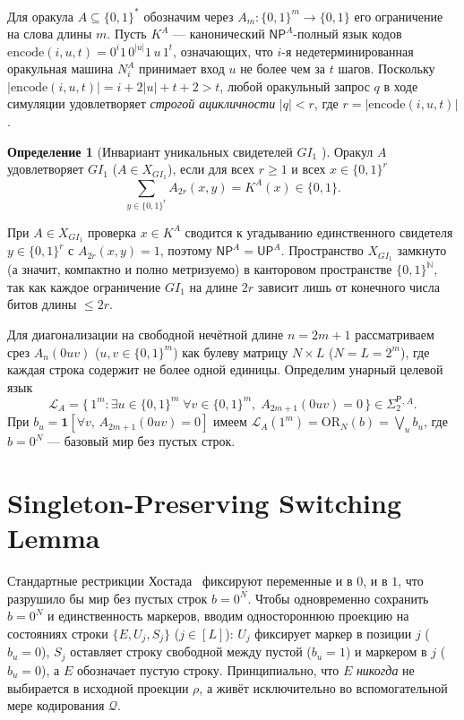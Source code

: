 \documentclass[11pt,a4paper]{article}
\theoremstyle{definition}
\newtheorem{definition}[theorem]{Определение}
\theoremstyle{remark}
\newcommand{\NP}{\mathsf{NP}}
\newcommand{\UP}{\mathsf{UP}}
\newcommand{\SigTwo}{\Sigma_2^{\mathsf{P}}}
\newcommand{\OR}{\mathrm{OR}}
\newcommand{\GI}{GI_1}
\begin{document}
Для оракула $A \subseteq \{0,1\}^*$ обозначим через $A_m : \{0,1\}^m \to \{0,1\}$ его ограничение на слова длины $m$. Пусть $K^A$ — канонический $\NP^A$-полный язык кодов $\mathrm{encode}(i, u, t) = 0^i 1\, 0^{|u|} 1\, u\, 1^t$, означающих, что $i$-я недетерминированная оракульная машина $N_i^A$ принимает вход $u$ не более чем за $t$ шагов. Поскольку $|\mathrm{encode}(i, u, t)| = i + 2|u| + t + 2 > t$, любой оракульный запрос $q$ в ходе симуляции удовлетворяет \emph{строгой ацикличности} $|q| < r$, где $r = |\mathrm{encode}(i, u, t)|$.

\begin{definition}[Инвариант уникальных свидетелей $\GI$ \cite{GlasserWechsung2003}]
Оракул $A$ удовлетворяет $\GI$ ($A \in X_{\GI}$), если для всех $r \ge 1$ и всех $x \in \{0,1\}^r$
\[
  \sum_{y \in \{0,1\}^r} A_{2r}(x, y) = K^A(x) \in \{0,1\}.
\]
\end{definition}

При $A \in X_{\GI}$ проверка $x \in K^A$ сводится к угадыванию единственного свидетеля $y \in \{0,1\}^r$ с $A_{2r}(x, y) = 1$, поэтому $\NP^A = \UP^A$. Пространство $X_{\GI}$ замкнуто (а значит, компактно и полно метризуемо) в канторовом пространстве $\{0,1\}^{\mathbb{N}}$, так как каждое ограничение $\GI$ на длине $2r$ зависит лишь от конечного числа битов длины $\le 2r$.

Для диагонализации на свободной нечётной длине $n = 2m + 1$ рассматриваем срез $A_n(0uv)$ ($u, v \in \{0,1\}^m$) как булеву матрицу $N \times L$ ($N = L = 2^m$), где каждая строка содержит не более одной единицы. Определим унарный целевой язык
\[
  \mathcal{L}_A = \bigl\{\, 1^m : \exists u \in \{0,1\}^m\; \forall v \in \{0,1\}^m,\; A_{2m+1}(0uv) = 0 \,\bigr\} \in \SigTwo{}^{,A}.
\]
При $b_u = \mathbf{1}[\forall v,\, A_{2m+1}(0uv) = 0]$ имеем $\mathcal{L}_A(1^m) = \OR_N(b) = \bigvee_u b_u$, где $b = 0^N$ — базовый мир без пустых строк.

\section{Singleton-Preserving Switching Lemma}

Стандартные рестрикции Хостада~\cite{Hastad1986} фиксируют переменные и в $0$, и в $1$, что разрушило бы мир без пустых строк $b = 0^N$. Чтобы одновременно сохранить $b = 0^N$ и единственность маркеров, вводим одностороннюю проекцию на состояниях строки $\{E, U_j, S_j\}$ ($j \in [L]$): $U_j$ фиксирует маркер в позиции $j$ ($b_u = 0$), $S_j$ оставляет строку свободной между пустой ($b_u = 1$) и маркером в $j$ ($b_u = 0$), а $E$ обозначает пустую строку. Принципиально, что $E$ \emph{никогда} не выбирается в исходной проекции $\rho$, а живёт исключительно во вспомогательной мере кодирования $\mathcal{Q}$.
\end{document}
